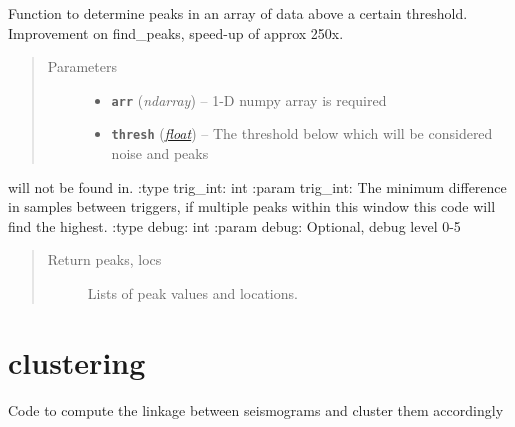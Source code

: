 \documentclass[a4paper,10pt,english]{sphinxmanual}
\begin{document}

\begin{fulllineitems}
\label{modules:findpeaks.find_peaks2}
Function to determine peaks in an array of data above a certain threshold.
Improvement on find\_peaks, speed-up of approx 250x.
\begin{quote}\begin{description}
\item[{Parameters}] \leavevmode\begin{itemize}
\item {} 
\textbf{\texttt{arr}} (\emph{ndarray}) -- 1-D numpy array is required

\item {} 
\textbf{\texttt{thresh}} (\href{https://docs.python.org/library/functions.html\#float}{\emph{float}}) -- The threshold below which will be considered noise and peaks

\end{itemize}

\end{description}\end{quote}

will not be found in.
:type trig\_int: int
:param trig\_int: The minimum difference in samples between triggers,
if multiple peaks within this window this code will find the highest.
:type debug: int
:param debug: Optional, debug level 0-5
\begin{quote}\begin{description}
\item[{Return peaks, locs}] \leavevmode
Lists of peak values and locations.

\end{description}\end{quote}

\end{fulllineitems}



\section{clustering}
\label{modules:clustering}\label{modules:module-clustering}
Code to compute the linkage between seismograms and cluster them accordingly
\end{document}

